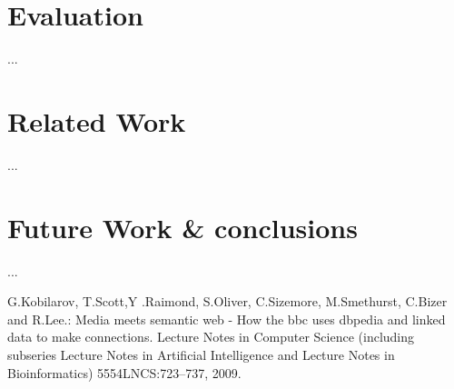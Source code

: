 \documentclass{llncs}
\begin{document}
\section{Evaluation}
%
...
%
\section{Related Work}
%
...
%
\section{Future Work \& conclusions}
%
...

%
%
%

%

%
%
\begin{thebibliography}{5}
%
G.Kobilarov, T.Scott,Y .Raimond, S.Oliver, C.Sizemore, M.Smethurst, C.Bizer and R.Lee.:
Media meets semantic web - How the bbc uses dbpedia and linked data to make connections.
Lecture Notes in Computer Science (including subseries Lecture Notes in Artiﬁcial Intelligence and Lecture Notes in Bioinformatics)
5554LNCS:723–737, 2009.

\end{thebibliography}
\end{document}

